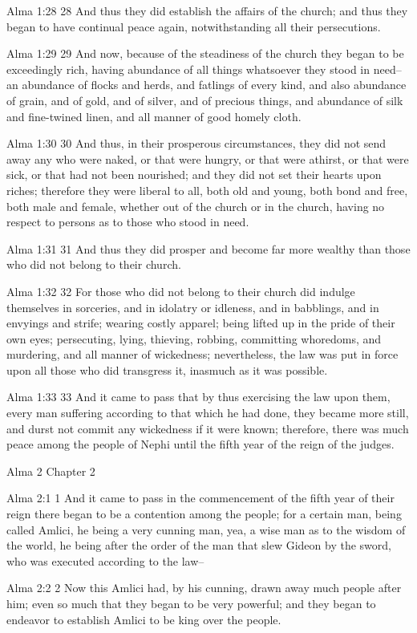 Alma 1:28
 28 And thus they did establish the affairs of the church; and
thus they began to have continual peace again, notwithstanding
all their persecutions.

Alma 1:29
 29 And now, because of the steadiness of the church they began
to be exceedingly rich, having abundance of all things whatsoever
they stood in need--an abundance of flocks and herds, and
fatlings of every kind, and also abundance of grain, and of gold,
and of silver, and of precious things, and abundance of silk and
fine-twined linen, and all manner of good homely cloth.

Alma 1:30
 30 And thus, in their prosperous circumstances, they did not
send away any who were naked, or that were hungry, or that were
athirst, or that were sick, or that had not been nourished; and
they did not set their hearts upon riches; therefore they were
liberal to all, both old and young, both bond and free, both male
and female, whether out of the church or in the church, having no
respect to persons as to those who stood in need.

Alma 1:31
 31 And thus they did prosper and become far more wealthy than
those who did not belong to their church.

Alma 1:32
 32 For those who did not belong to their church did indulge
themselves in sorceries, and in idolatry or idleness, and in
babblings, and in envyings and strife; wearing costly apparel;
being lifted up in the pride of their own eyes; persecuting,
lying, thieving, robbing, committing whoredoms, and murdering,
and all manner of wickedness; nevertheless, the law was put in
force upon all those who did transgress it, inasmuch as it was
possible.

Alma 1:33
 33 And it came to pass that by thus exercising the law upon
them, every man suffering according to that which he had done,
they became more still, and durst not commit any wickedness if it
were known; therefore, there was much peace among the people of
Nephi until the fifth year of the reign of the judges.

Alma 2
Chapter 2

Alma 2:1
 1 And it came to pass in the commencement of the fifth year of
their reign there began to be a contention among the people; for
a certain man, being called Amlici, he being a very cunning man,
yea, a wise man as to the wisdom of the world, he being after the
order of the man that slew Gideon by the sword, who was executed
according to the law--

Alma 2:2
 2 Now this Amlici had, by his cunning, drawn away much people
after him; even so much that they began to be very powerful; and
they began to endeavor to establish Amlici to be king over the
people.

